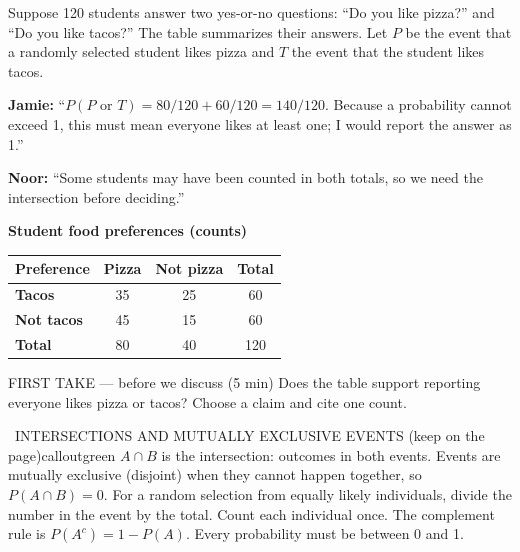 \documentclass[11pt]{article}
\begin{document}


Suppose 120 students answer two yes-or-no questions: ``Do you like pizza?'' and ``Do you like tacos?'' The table summarizes their answers. Let $P$ be the event that a randomly selected student likes pizza and $T$ the event that the student likes tacos.\par\smallskip \textbf{Jamie:} ``$P(P\text{ or }T)=80/120+60/120=140/120$. Because a probability cannot exceed 1, this must mean everyone likes at least one; I would report the answer as 1.''\par \textbf{Noor:} ``Some students may have been counted in both totals, so we need the intersection before deciding.''\par
\begin{center}
\textbf{Student food preferences (counts)}\par\smallskip
\begin{tabular}{|l|c|c|c|}
\hline
\textbf{Preference} & \textbf{Pizza} & \textbf{Not pizza} & \textbf{Total} \\ \hline
\textbf{Tacos} & 35 & 25 & 60 \\ \hline
\textbf{Not tacos} & 45 & 15 & 60 \\ \hline
\textbf{Total} & 80 & 40 & 120 \\ \hline
\end{tabular}
\end{center}
\begin{firsttakebox}{FIRST TAKE --- before we discuss (5 min)}
Does the table support reporting everyone likes pizza or tacos? Choose a claim and cite one count.
\workspace{0.9in}
\end{firsttakebox}

\begin{callout}{\IconBook\ INTERSECTIONS AND MUTUALLY EXCLUSIVE EVENTS (keep on the page)}{calloutgreen}
$A\cap B$ is the intersection: outcomes in both events. Events are mutually exclusive (disjoint) when they cannot happen together, so $P(A\cap B)=0$. For a random selection from equally likely individuals, divide the number in the event by the total. Count each individual once. The complement rule is $P(A^c)=1-P(A)$. Every probability must be between 0 and 1.
\end{callout}
\end{document}
